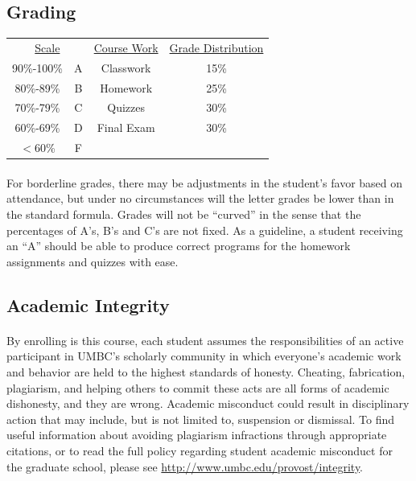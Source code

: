 \documentclass[letter,11pt]{article}
\begin{document}
\subsection*{Grading}

\begin{center}
\begin{tabular}{ c c || c c}
\multicolumn{2}{c||}{\underline{Scale}} & \underline{Course Work} & \underline{Grade Distribution} \\
90\%-100\% & A & Classwork & 15\% \\
80\%-89\% & B & Homework & 25\% \\
70\%-79\% & C & Quizzes & 30\% \\ 
60\%-69\% & D & Final Exam & 30\% \\
$<$60\%     & F & 
\end{tabular}
\end{center}

\paragraph{}For borderline grades, there may be adjustments in the student's favor based on attendance, but under no circumstances will the letter grades be lower than in the standard formula. Grades will not be ``curved'' in the sense that the percentages of A's, B's and C's are not fixed. As a guideline, a student receiving an ``A'' should be able to produce correct programs for the homework assignments and quizzes with ease.

\subsection*{Academic Integrity}
\paragraph{}By enrolling is this course, each student assumes the responsibilities of an active participant in UMBC's scholarly community in which everyone's academic work and behavior are held to the highest standards of honesty. Cheating, fabrication, plagiarism, and helping others to commit these acts are all forms of academic dishonesty, and they are wrong. Academic misconduct could result in disciplinary action that may include, but is not limited to, suspension or dismissal. To find useful information about avoiding plagiarism infractions through appropriate citations, or to read the full policy regarding student academic misconduct for the graduate school, please see \url{http://www.umbc.edu/provost/integrity}.
\end{document}
